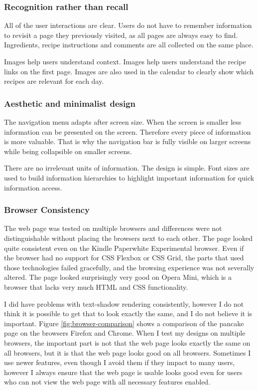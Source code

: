 \documentclass[a4paper]{scrartcl}
\begin{document}
\subsubsection{Recognition rather than recall}
All of the user interactions are clear. Users do not have to remember information to revisit a page they previously visited, as all pages are always easy to find. Ingredients, recipe instructions and comments are all collected on the same place.

Images help users understand context. Images help users understand the recipe links on the first page. Images are also used in the calendar to clearly show which recipes are relevant for each day.

\subsubsection{Aesthetic and minimalist design}
The navigation menu adapts after screen size. When the screen is smaller less information can be presented on the screen. Therefore every piece of information is more valuable. That is why the navigation bar is fully visible on larger screens while being collapsible on smaller screens.

There are no irrelevant units of information. The design is simple. Font sizes are used to build information hierarchies to highlight important information for quick information access.

\subsubsection{Browser Consistency}
The web page was tested on multiple browsers and differences were not distinguishable without placing the browsers next to each other. The page looked quite consistent even on the Kindle Paperwhite Experimental browser. Even if the browser had no support for CSS Flexbox or CSS Grid, the parts that used those technologies failed gracefully, and the browsing experience was not severally altered. The page looked surprisingly very good on Opera Mini, which is a browser that lacks very much HTML and CSS functionality.

I did have problems with text-shadow rendering consistently, however I do not think it is possible to get that to look exactly the same, and I do not believe it is important. Figure \ref{fig:browser-comparison} shows a comparison of the pancake page on the browsers Firefox and Chrome. When I test my designs on multiple browsers, the important part is not that the web page looks exactly the same on all browsers, but it is that the web page looks good on all browsers. Sometimes I use newer features, even though I avoid them if they impact to many users, however I always ensure that the web page is usable looks good even for users who can not view the web page with all necessary features enabled.
\end{document}
